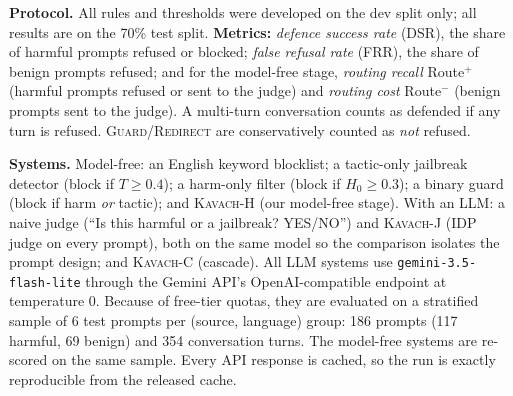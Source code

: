 \documentclass[conference]{IEEEtran}
\begin{document}
\begin{table}[t]
\centering\footnotesize
\caption{Evaluation data (test split; dev split is 30\% of items, grouped so translations of one prompt stay together).}
\label{tab:data}
\end{table}

\textbf{Protocol.} All rules and thresholds were developed on the dev split only; all results are on the 70\% test split. \textbf{Metrics:} \emph{defence success rate} (DSR), the share of harmful prompts refused or blocked; \emph{false refusal rate} (FRR), the share of benign prompts refused; and for the model-free stage, \emph{routing recall} Route$^+$ (harmful prompts refused or sent to the judge) and \emph{routing cost} Route$^-$ (benign prompts sent to the judge). A multi-turn conversation counts as defended if any turn is refused. \textsc{Guard}/\textsc{Redirect} are conservatively counted as \emph{not} refused.

\textbf{Systems.} Model-free: an English keyword blocklist; a tactic-only jailbreak detector (block if $T\ge0.4$); a harm-only filter (block if $H_0\ge0.3$); a binary guard (block if harm \emph{or} tactic); and \textsc{Kavach}-H (our model-free stage). With an LLM: a naive judge (``Is this harmful or a jailbreak? YES/NO'') and \textsc{Kavach}-J (IDP judge on every prompt), both on the same model so the comparison isolates the prompt design; and \textsc{Kavach}-C (cascade). All LLM systems use \texttt{gemini-3.5-flash-lite} through the Gemini API's OpenAI-compatible endpoint at temperature 0. Because of free-tier quotas, they are evaluated on a stratified sample of 6 test prompts per (source, language) group: 186 prompts (117 harmful, 69 benign) and 354 conversation turns. The model-free systems are re-scored on the same sample. Every API response is cached, so the run is exactly reproducible from the released cache.
\end{document}

